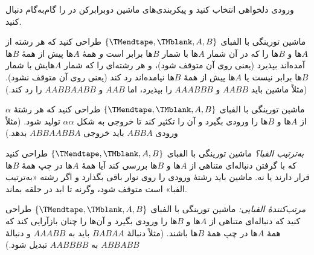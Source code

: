 \documentclass[../../../include/open-logic-section]{subfiles}
\begin{document}
\begin{prob}
ورودی دلخواهی انتخاب کنید و پیکربندی‌های ماشین دوبرابرکن در
 را گام‌به‌گام دنبال کنید.
\end{prob}

\begin{prob}
ماشین تورینگی با الفبای $\{\TMendtape,\TMblank,A,B\}$ طراحی کنید که
هر رشته از $A$ها و $B$ها را که در آن شمار $A$ها با شمار $B$ها برابر
است \emph{و} همهٔ $A$ها پیش از همهٔ $B$ها آمده‌اند بپذیرد (یعنی روی
آن متوقف شود)، و هر رشته‌ای را که شمار $A$هایش با شمار $B$ها برابر
نیست یا $A$ها پیش از همهٔ $B$ها نیامده‌اند رد کند (یعنی روی آن متوقف
نشود). (مثلاً ماشین باید $AABB$ و $AAABBB$ را بپذیرد، اما $AAB$ و
$AABBAABB$ را رد کند.)
\end{prob}

\begin{prob}
ماشین تورینگی با الفبای $\{\TMendtape,\TMblank,A,B\}$ طراحی کنید که
هر رشتهٔ $\alpha$ از $A$ها و $B$ها را ورودی بگیرد و آن را تکثیر کند
تا خروجی به شکل $\alpha\alpha$ تولید شود. (مثلاً ورودی $ABBA$ باید
خروجی $ABBAABBA$ بدهد.)
\end{prob}

\begin{prob}
\emph{به‌ترتیب الفبا؟} ماشین تورینگی با الفبای
$\{\TMendtape,\TMblank,A,B\}$ طراحی کنید که با گرفتن دنباله‌ای متناهی
از $A$ها و $B$ها بررسی کند آیا همهٔ $A$ها در چپ همهٔ $B$ها قرار
دارند یا نه. ماشین باید رشتهٔ ورودی را روی نوار باقی بگذارد و اگر
رشته «به‌ترتیب الفبا» است متوقف شود، وگرنه تا ابد در حلقه بماند.
\end{prob}

\begin{prob}
\emph{مرتب‌کنندهٔ الفبایی:} ماشین تورینگی با الفبای
$\{\TMendtape,\TMblank,A,B\}$ طراحی کنید که دنباله‌ای متناهی از $A$ها
و $B$ها را ورودی بگیرد و آن‌ها را چنان بازآرایی کند که همهٔ $A$ها در
چپ همهٔ $B$ها باشند. (مثلاً دنبالهٔ $BABAA$ باید به $AAABB$ و دنبالهٔ
$ABBABB$ به $AABBBB$ تبدیل شود.)
\end{prob}
\end{document}
